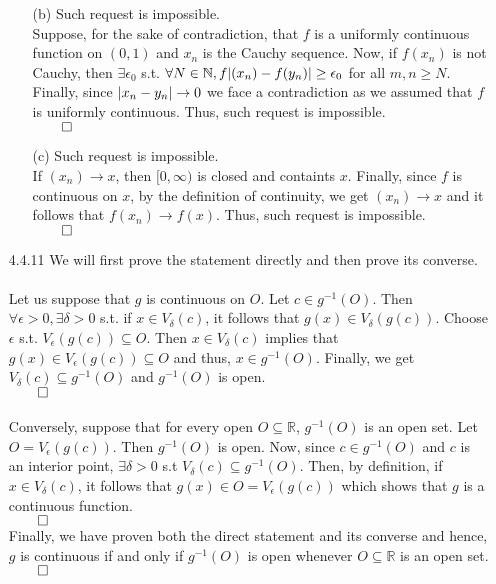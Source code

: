 \documentclass[11pt]{article}
\DeclarePairedDelimiter\abs{\lvert}{\rvert}%
\newcommand{\nats}{\mathbb{N}}
\newcommand{\reals}{\mathbb{R}}
\begin{document}
\begin{itemize}
\begin{itemize}
            \item[(b)]
                Such request is impossible.\\
                Suppose, for the sake of contradiction, that $f$ is a uniformly
                continuous function on $(0, 1)$ and $x_n$ is the Cauchy sequence.
                Now, if $f(x_n)$ is not Cauchy, then $\exists \epsilon_0$ s.t.
                $\forall N \in \nats, f\abs{(x_n) - f(y_n)} \geq \epsilon_0$
                for all $m, n \geq N$. Finally, since $\abs{x_n - y_n} \to 0$
                we face a contradiction as we assumed that $f$ is uniformly
                continuous. Thus, such request is impossible.\\
                $\qed$

            \item[(c)]
                Such request is impossible.\\
                If $(x_n) \to x$, then $[0, \infty)$ is closed and containts
                $x$. Finally, since $f$ is continuous on $x$, by the definition
                of continuity, we get $(x_n) \to x$ and it follows that
                $f(x_n) \to f(x)$. Thus, such request is impossible.\\
                $\qed$
        \end{itemize}

    \item[4.4.11]
        We will first prove the statement directly and then prove its converse.
        \\
        \\
        Let us suppose that $g$ is continuous on $O$. Let $c \in g^{-1}(O)$.
        Then $\forall \epsilon > 0, \exists \delta > 0$ s.t. if $x \in V_\delta(c)$,
        it follows that $g(x) \in V_\delta(g(c))$. Choose $\epsilon$ s.t.
        $V_\epsilon(g(c)) \subseteq O$. Then $x \in V_\delta(c)$ implies that
        $g(x) \in V_\epsilon(g(c)) \subseteq O$ and thus, $x \in g^{-1}(O)$.
        Finally, we get $V_\delta(c) \subseteq g^{-1}(O)$ and $g^{-1}(O)$ is
        open.\\
        $\qed$
        \\
        \\
        Conversely, suppose that for every open $O \subseteq \reals$,
        $g^{-1}(O)$ is an open set. Let $O = V_\epsilon(g(c))$. Then
        $g^{-1}(O)$ is open. Now, since $c \in g^{-1}(O)$ and $c$ is an
        interior point, $\exists \delta > 0$ s.t $V_\delta(c) \subseteq
        g^{-1}(O)$. Then, by definition, if $x \in V_\delta(c)$, it follows
        that $g(x) \in O = V_\epsilon(g(c))$ which shows that $g$ is a
        continuous function.\\
        $\qed$
        \\
        Finally, we have proven both the direct statement and its converse and
        hence, $g$ is continuous if and only if $g^{-1}(O)$ is open whenever $O
        \subseteq \reals$ is an open set.\\
        $\qed$


\end{itemize}
\end{document}
